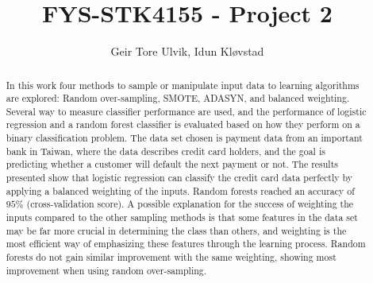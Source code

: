 \documentclass[12pt, notitlepage]{article}
\begin{document}
\title{FYS-STK4155 - Project 2}
\author{Geir Tore Ulvik, Idun Kløvstad}
\begin{titlingpage}
\maketitle
\begin{abstract}
In this work four methods to sample or manipulate input data to learning
algorithms are explored: Random over-sampling, SMOTE, ADASYN, and balanced
weighting.
Several way to measure classifier performance are used, and the performance 
of logistic regression and a random forest classifier is evaluated based 
on how they perform on a binary classification problem. 
The data set chosen is payment data from an important bank in Taiwan,
where the data describes credit card holders, and the goal is predicting
whether a customer will default the next payment or not. 
The results presented show that logistic regression can classify the credit 
card data perfectly by applying a balanced weighting of the inputs. 
Random forests reached an accuracy of ~$95\%$ (cross-validation score). 
A possible explanation for the success of weighting the inputs compared 
to the other sampling methods is that some features in the data set may be 
far more crucial in determining the class than others, 
and weighting is the most efficient way of emphasizing these features through 
the learning process. Random forests do not gain similar improvement with
the same weighting, showing most improvement when using random over-sampling.
\end{abstract}
\end{titlingpage}






\appendix


\end{document}
